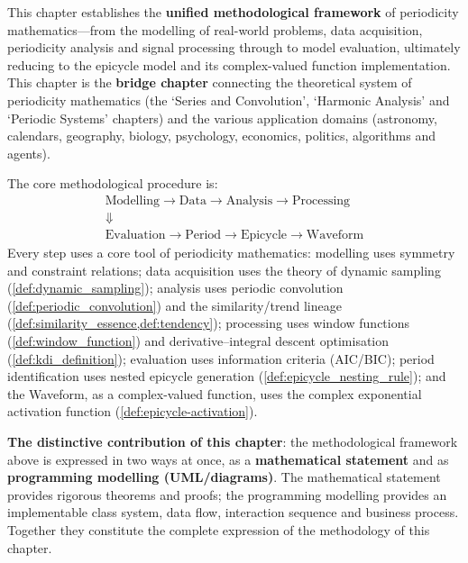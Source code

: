\begin{remark}\label{rem:modelling_analysis_positioning}
This chapter establishes the \textbf{unified methodological framework} of periodicity mathematics---from the modelling of real-world problems, data acquisition, periodicity analysis and signal processing through to model evaluation, ultimately reducing to the epicycle model and its complex-valued function implementation. This chapter is the \textbf{bridge chapter} connecting the theoretical system of periodicity mathematics (the `Series and Convolution', `Harmonic Analysis' and `Periodic Systems' chapters) and the various application domains (astronomy, calendars, geography, biology, psychology, economics, politics, algorithms and agents).

The core methodological procedure is:
\[
\begin{gathered}
\boxed{\text{Modelling}} \to \boxed{\text{Data}} \to \boxed{\text{Analysis}} \to \boxed{\text{Processing}}
\\ \Downarrow \\
\boxed{\text{Evaluation}} \to \boxed{\text{Period}} \to \boxed{\text{Epicycle}} \to \boxed{\text{Waveform}}
\end{gathered}
\]
Every step uses a core tool of periodicity mathematics: modelling uses symmetry and constraint relations; data acquisition uses the theory of dynamic sampling (\cref{def:dynamic_sampling}); analysis uses periodic convolution (\cref{def:periodic_convolution}) and the similarity/trend lineage (\cref{def:similarity_essence,def:tendency}); processing uses window functions (\cref{def:window_function}) and derivative--integral descent optimisation (\cref{def:kdi_definition}); evaluation uses information criteria (AIC/BIC); period identification uses nested epicycle generation (\cref{def:epicycle_nesting_rule}); and the Waveform, as a complex-valued function, uses the complex exponential activation function (\cref{def:epicycle-activation}).

\textbf{The distinctive contribution of this chapter}: the methodological framework above is expressed in two ways at once, as a \textbf{mathematical statement} and as \textbf{programming modelling (UML/diagrams)}. The mathematical statement provides rigorous theorems and proofs; the programming modelling provides an implementable class system, data flow, interaction sequence and business process. Together they constitute the complete expression of the methodology of this chapter.


\end{remark}
